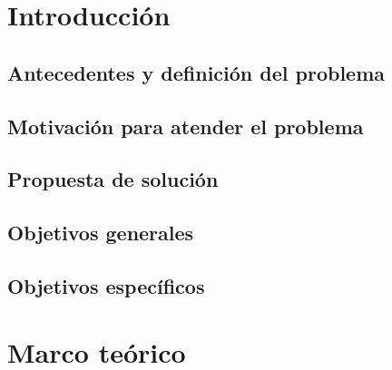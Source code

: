 \documentclass[12pt]{report}
\begin{document}
\newpage

 
\newpage


\newpage
\tableofcontents

\newpage
\listoftables
{} %
\listoffigures
{}

\chapter{Introducción}


\section{Antecedentes y definición del problema}


\section{Motivación para atender el problema}


\section{Propuesta de solución}


\section{Objetivos generales}


\section{Objetivos específicos}



\chapter{Marco teórico}

\end{document}
